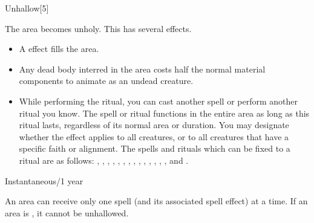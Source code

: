 \begin{spellsection}{Unhallow}[5]
    \begin{spellheader}
    \end{spellheader}
    \begin{spellcontent}
        \begin{spelltargetinginfo}
        \end{spelltargetinginfo}
        \begin{spelleffects}

            \spelleffect The area becomes unholy. This has several effects.
            \begin{itemize}
                \item A  effect fills the area.
                \item Any dead body interred in the area costs half the normal material components to animate as an undead creature.
                \item While performing the ritual, you can cast another spell or perform another ritual you know. The spell or ritual functions in the entire area as long as this ritual lasts, regardless of its normal area or duration. You may designate whether the effect applies to all creatures, or to all creatures that have a specific faith or alignment. The spells and rituals which can be fixed to a  ritual are as follows: , , , , , , , , , , , , , , and .
            \end{itemize}
            \spelldur Instantaneous/1 year
        \end{spelleffects}
    \end{spellcontent}
    \begin{spellfooter}
        \spellnotes An area can receive only one  spell (and its associated spell effect) at a time. If an area is , it cannot be unhallowed.
    \end{spellfooter}
\end{spellsection}

